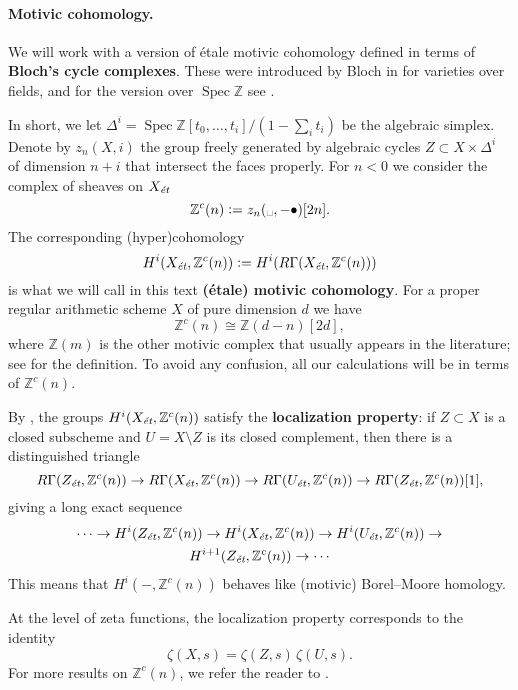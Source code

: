 \documentclass{article}
\DeclareMathOperator{\Spec}{Spec}
\newcommand{\ZZ}{\mathbb{Z}}
\newcommand{\et}{\text{\it \'{e}t}}
\newcommand{\dfn}{\mathrel{\mathop:}=}
\theoremstyle{myplain}
\theoremstyle{mydefinition}
\begin{document}
\paragraph{Motivic cohomology.}
We will work with a version of \'{e}tale motivic cohomology defined in terms of
\textbf{Bloch's cycle complexes}. These were introduced by Bloch in
\cite{Bloch-1986} for varieties over fields, and for the version over
$\Spec \ZZ$ see \cite{Geisser-2004-Dedekind,Geisser-2005}.

In short, we let $\Delta^i = \Spec \ZZ [t_0,\ldots,t_i] / (1 - \sum_i t_i)$ be
the algebraic simplex. Denote by $z_n (X, i)$ the group freely generated by
algebraic cycles $Z \subset X \times \Delta^i$ of dimension $n+i$ that intersect
the faces properly. For $n < 0$ we consider the complex of sheaves on $X_\et$
$$\ZZ^c (n) \dfn z_n (\text{\textvisiblespace}, -\bullet) [2n].$$
The corresponding (hyper)cohomology
$$H^i (X_\et, \ZZ^c (n)) \dfn H^i (R\Gamma (X_\et, \ZZ^c (n)))$$
is what we will call in this text \textbf{(\'{e}tale) motivic cohomology}.
For a proper regular arithmetic scheme $X$ of pure dimension $d$ we have
\begin{equation}
  \label{eqn:Zc(n)-vs-Z(d-n)}
  \ZZ^c (n) \cong \ZZ (d-n) [2d],
\end{equation}
where $\ZZ (m)$ is the other motivic complex that usually appears in the
literature; see \cite{Geisser-2004-Dedekind,Geisser-2005} for the definition.
To avoid any confusion, all our calculations will be in terms of $\ZZ^c (n)$.

By \cite[Corollary~7.2]{Geisser-2010}, the groups $H^i (X_\et, \ZZ^c (n))$
satisfy the \textbf{localization property}: if $Z \subset X$ is a closed
subscheme and $U = X\setminus Z$ is its closed complement, then there is a
distinguished triangle
\[ R\Gamma (Z_\et, \ZZ^c (n)) \to
  R\Gamma (X_\et, \ZZ^c (n)) \to
  R\Gamma (U_\et, \ZZ^c (n)) \to 
  R\Gamma (Z_\et, \ZZ^c (n)) [1], \]
giving a long exact sequence
\begin{multline}
  \label{eqn:localization-les}
  \cdots \to H^i (Z_\et, \ZZ^c (n)) \to
  H^i (X_\et, \ZZ^c (n)) \to
  H^i (U_\et, \ZZ^c (n)) \to \\
  H^{i+1} (Z_\et, \ZZ^c (n)) \to \cdots
\end{multline}
This means that $H^i (-, \ZZ^c (n))$ behaves like (motivic) Borel--Moore
homology.

At the level of zeta functions, the localization property corresponds to the
identity
$$\zeta (X,s) = \zeta (Z,s)\,\zeta (U,s).$$
For more results on $\ZZ^c (n)$, we refer the reader to \cite{Geisser-2010}.
 
\end{document}
